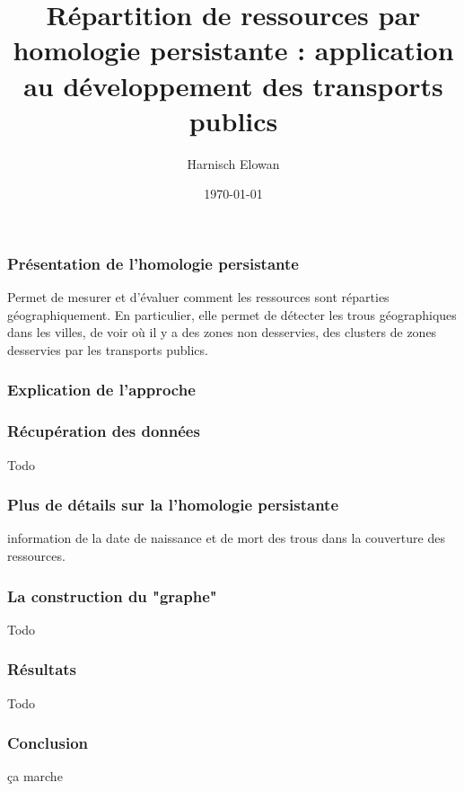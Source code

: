 \documentclass{beamer}
\begin{document}
\title{Répartition de ressources par homologie persistante : 
    application au développement des transports publics}
\author{Harnisch Elowan}
\date{\today}

\maketitle

\begin{frame}
    \frametitle{Présentation de l'homologie persistante}
    Permet de mesurer et d'évaluer comment les ressources sont réparties 
    géographiquement. En particulier, elle permet de détecter les trous
    géographiques dans les villes, de voir où il y a des zones non desservies,
    des clusters de zones desservies par les transports publics.

\end{frame}

\begin{frame}
    \frametitle{Explication de l'approche}
\end{frame}

\begin{frame}
    \frametitle{Récupération des données}
    Todo
\end{frame}

\begin{frame}
    \frametitle{Plus de détails sur la l'homologie persistante}
    information de la date de naissance et de mort des trous dans la couverture
    des ressources.
    
\end{frame}

\begin{frame}
    \frametitle{La construction du "graphe"}
    Todo
\end{frame}

\begin{frame}
    \frametitle{Résultats}
    Todo
\end{frame}

\begin{frame}
    \frametitle{Conclusion}
    ça marche
\end{frame}
\end{document}
